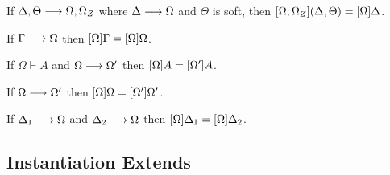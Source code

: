 \begin{mlemma}
  If $\Delta, \Theta \longrightarrow \Omega, \Omega_Z$ where $\Delta \longrightarrow \Omega$ and $\Theta$ is soft, then $[\Omega, \Omega_Z](\Delta, \Theta) = [\Omega]\Delta$.
  \label{lemma:subst_go_away}
\end{mlemma}


\begin{mlemma}
  If $\Gamma \longrightarrow \Omega$ then $[\Omega]\Gamma = [\Omega]\Omega$.
  \label{lemma:stable_complete_ctxt}
\end{mlemma}

\begin{mlemma}
  If $\Omega \vdash A$ and $\Omega \longrightarrow \Omega'$ then $[\Omega]A = [\Omega']A$.
  \label{lemma:finish_types}
\end{mlemma}


\begin{mlemma}
  If $\Omega \longrightarrow \Omega'$ then $[\Omega]\Omega = [\Omega']\Omega'$.
  \label{lemma:finish_complete}
\end{mlemma}


\begin{mlemma}
  If $\Delta_1 \longrightarrow \Omega$ and $\Delta_2 \longrightarrow \Omega$ then
  $[\Omega]\Delta_1 = [\Omega]\Delta_2$.
  \label{lemma:confluence}
\end{mlemma}


\subsection{Instantiation Extends}


